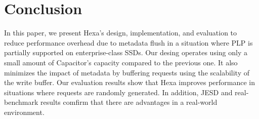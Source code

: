 \section{Conclusion}
In this paper, we present Hexa's design, implementation, 
and evaluation to reduce performance overhead due to metadata flush in 
a situation where PLP is partially supported on enterprise-class SSDs. 
Our desing operates using only a small amount of Capacitor's capacity compared
to the previous one. It also minimizes the impact of metadata by buffering requests using the 
scalability of the write buffer. 
Our evaluation results show that Hexa improves performance in situations where requests are randomly generated. 
In addition, JESD and real-benchmark results comfirm that there are advantages in a real-world environment.

